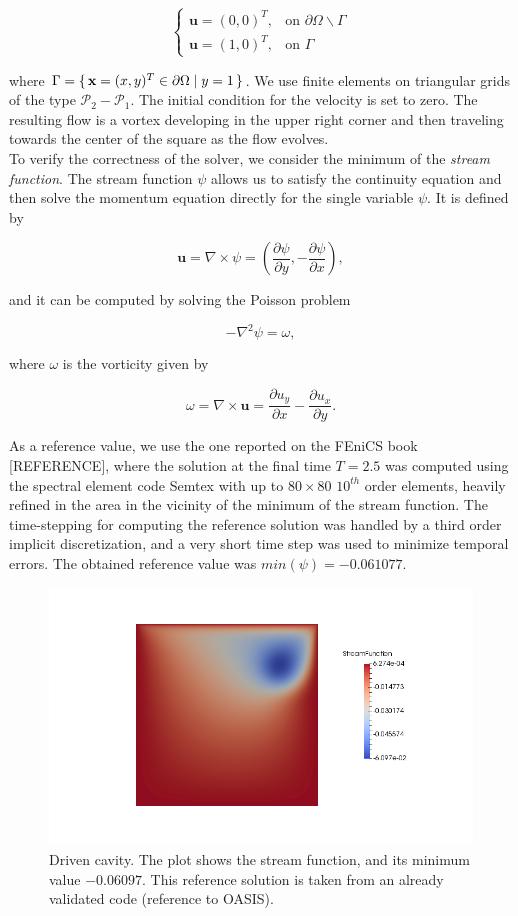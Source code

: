 \documentclass[11pt,a4paper,titlepage]{report}
\begin{document}
\[
\begin{cases}
\mathbf{u} = (0, 0)^T, & \mbox{on } \partial \Omega \backslash \Gamma \\
\mathbf{u} = (1, 0)^T, & \mbox{on } \Gamma
\end{cases}
\]

where $ \Gamma = \set{ \mathbf{x} = (x,y)^T \in \partial \Omega | y = 1}$. We use finite elements on triangular grids of the type $\mathcal{P}_2-\mathcal{P}_1$. The initial condition for the velocity is set to zero. The resulting flow is a vortex developing in the upper right corner and then traveling towards the center of the square as the flow evolves. \\
To verify the correctness of the solver, we consider the minimum of the \textit{stream function}. The stream function $\psi$ allows us to satisfy the continuity equation and then solve the momentum equation directly for the single variable $\psi$. It is defined by

\[
\mathbf{u} = \nabla \times \psi = (\frac{\partial \psi}{\partial y} , - \frac{\partial \psi }{\partial x}),
\]

and it can be computed by solving the Poisson problem

\[
- \nabla^2 \psi = \omega,
\]

where $\omega$ is the vorticity given by

\[
\omega = \nabla \times \mathbf{u} = \frac{\partial u_y}{\partial x} - \frac{\partial u_x}{\partial y}.
\]


As a reference value, we use the one reported on the FEniCS book [REFERENCE], where the solution at the final time $T = 2.5$ was computed using the spectral element code Semtex with up to $80 \times 80$ $10^{th}$ order elements, heavily refined in the area in the vicinity of the minimum of the stream function. The time-stepping for computing the reference solution was handled by a third order implicit discretization, and a very short time step was used to minimize temporal errors.  The obtained reference value was $min(\psi) = -0.061 077$.

\begin{figure}[ht]
\centering
\includegraphics[width=\textwidth]{images/oyvind.png}
\vspace{-1cm}
\caption{Driven cavity. The plot shows the stream function, and its minimum value $-0.06097$. This reference solution is taken from an already validated code (reference to OASIS).}
\end{figure}
\end{document}
